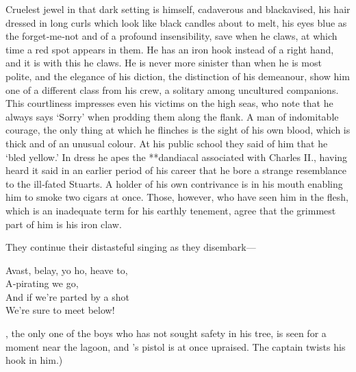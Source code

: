 \begin{stagedir}
Cruelest jewel in that dark setting is \hook himself, cadaverous and blackavised,
his hair dressed in long curls which look like black candles about to melt,
his eyes blue as the forget‐me‐not and of a profound insensibility,
save when he claws, at which time a red spot appears in them.
He has an iron hook instead of a right hand, and it is with this he claws.
He is never more sinister than when he is most polite,
and the elegance of his diction, the distinction of his demeanour,
show him one of a different class from his crew, a solitary among uncultured companions.
This courtliness impresses even his victims on the high seas,
who note that he always says ‘Sorry’ when prodding them along the flank.
A man of indomitable courage,
the only thing at which he flinches is the sight of his own blood, which is thick and of an unusual colour.
At his public school they said of him that he ‘bled yellow.’
In dress he apes the **dandiacal associated with Charles II.,
having heard it said in an earlier period of his career that he bore a strange resemblance to the ill‐fated Stuarts.
A holder of his own contrivance is in his mouth enabling him to smoke two cigars at once.
Those, however, who have seen him in the flesh, which is an inadequate term for his earthly tenement,
agree that the grimmest part of him is his iron claw.

They continue their distasteful singing as they disembark—

\begin{drama}
\speakercontinues
	Avast, belay, yo ho, heave to,\\
	A‐pirating we go,\\
	And if we’re parted by a shot\\
	We’re sure to meet below!
\end{drama}

\nibs, the only one of the boys who has not sought safety in his tree, is seen for a moment near the lagoon,
and \starkey’s pistol is at once upraised.
The captain twists his hook in him.)
\end{stagedir}

